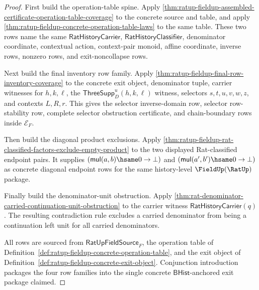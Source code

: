 \begin{proof}
First build the operation-table spine. Apply
\autoref{thm:ratup-fieldup-assembled-certificate-operation-table-coverage} to
the concrete source and table, and apply
\autoref{thm:ratup-fieldup-concrete-operation-table-laws} to the same table.
These two rows name the same $\mathsf{RatHistoryCarrier}$,
$\mathsf{RatHistoryClassifier}$, denominator coordinate, contextual action,
context-pair monoid, affine coordinate, inverse rows, nonzero rows, and
exit-noncollapse rows.

Next build the final inventory row family. Apply
\autoref{thm:ratup-fieldup-final-row-inventory-coverage} to the concrete exit
object, denominator tuple, carrier witnesses for $h,k,\ell$, the
$\mathsf{ThreeSupp}_D^u(h,k,\ell)$ witness, selectors $s,t,u,v,w,z$, and
contexts $L,R,r$. This gives the selector inverse-domain row, selector
row-stability row, complete selector obstruction certificate, and chain-boundary
rows inside $\mathcal E_F$.

Then build the diagonal product exclusions. Apply
\autoref{thm:ratup-fieldup-rat-classified-factors-exclude-empty-product} to the
two displayed Rat-classified endpoint pairs. It supplies
$(\mathsf{mul}(a,b)\hsame0\to\bot)$ and
$(\mathsf{mul}(a',b')\hsame0\to\bot)$ as concrete diagonal endpoint rows for
the same history-level $\FieldUp(\RatUp)$ package.

Finally build the denominator-unit obstruction. Apply
\autoref{thm:rat-denominator-carried-continuation-unit-obstruction} to the
carrier witness $\mathsf{RatHistoryCarrier}(q)$. The resulting contradiction
rule excludes a carried denominator from being a continuation left unit for all
carried denominators.

All rows are sourced from $\mathsf{RatUpFieldSource}_F$, the operation table of
Definition~\ref{def:ratup-fieldup-concrete-operation-table}, and the exit object
of Definition~\ref{def:ratup-fieldup-concrete-exit-object}. Conjunction
introduction packages the four row families into the single concrete
$\mathsf{BHist}$-anchored exit package claimed.
\end{proof}

